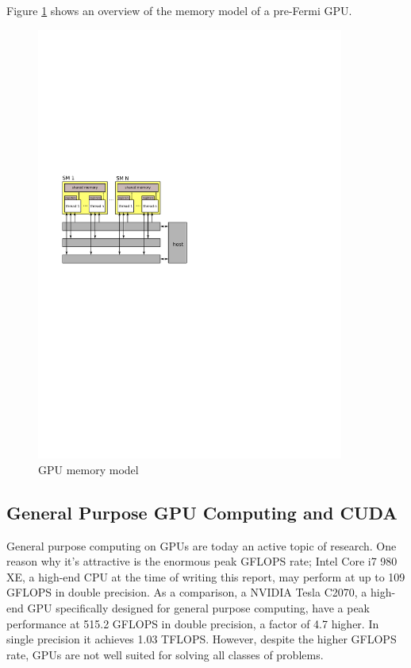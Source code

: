 Figure \ref{fig:gpu_memory_model} shows an overview of the memory model of a pre-Fermi GPU. 

\begin{figure}[ht]
\centering
\includegraphics[width=0.9\textwidth]{figure/gpu_memory_model}
\caption{GPU memory model}
\label{fig:gpu_memory_model}
\end{figure}

\subsection{General Purpose GPU Computing and CUDA}
General purpose computing on GPUs are today an active topic of research. One reason why it's attractive is the enormous peak GFLOPS rate; Intel Core i7 980 XE, a high-end CPU at the time of writing this report, may perform at up to 109 GFLOPS\cite{inteli7flops} in double precision. As a comparison, a NVIDIA Tesla C2070, a high-end GPU specifically designed for general purpose computing, have a peak performance at 515.2 GFLOPS in double precision, a factor of 4.7 higher. In single precision it achieves 1.03 TFLOPS. However, despite the higher GFLOPS rate, GPUs are not well suited for solving all classes of problems. 

